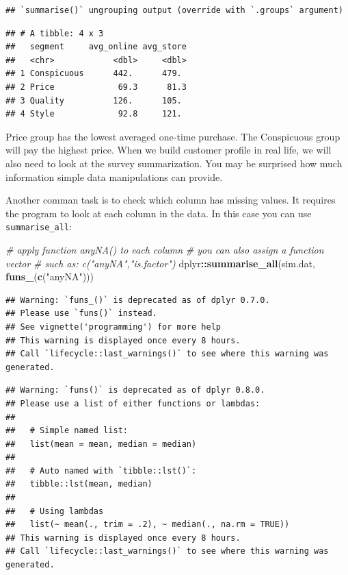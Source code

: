 \documentclass[12pt,]{krantz}
\makeatletter
\newenvironment{Shaded}{\begin{snugshade}}{\end{snugshade}}
\newcommand{\CommentTok}[1]{\textcolor[rgb]{0.37,0.37,0.37}{\textit{#1}}}
\newcommand{\KeywordTok}[1]{\textcolor[rgb]{0.27,0.27,0.27}{\textbf{#1}}}
\newcommand{\NormalTok}[1]{#1}
\newcommand{\OperatorTok}[1]{\textcolor[rgb]{0.43,0.43,0.43}{\textbf{#1}}}
\newcommand{\StringTok}[1]{\textcolor[rgb]{0.5,0.5,0.5}{#1}}
\newenvironment{kframe}{%
\medskip{}
\setlength{\fboxsep}{.8em}
 \def\at@end@of@kframe{}%
 \ifinner\ifhmode%
  \def\at@end@of@kframe{\end{minipage}}%
  \begin{minipage}{\columnwidth}%
 \fi\fi%
 \def\FrameCommand##1{\hskip\@totalleftmargin \hskip-\fboxsep
 \colorbox{shadecolor}{##1}\hskip-\fboxsep
     \hskip-\linewidth \hskip-\@totalleftmargin \hskip\columnwidth}%
 \MakeFramed {\advance\hsize-\width
   \@totalleftmargin\z@ \linewidth\hsize
   \@setminipage}}%
 {\par\unskip\endMakeFramed%
 \at@end@of@kframe}
\renewenvironment{Shaded}{\begin{kframe}}{\end{kframe}}
\makeatother
\begin{document}
\begin{verbatim}
## `summarise()` ungrouping output (override with `.groups` argument)
\end{verbatim}

\begin{verbatim}
## # A tibble: 4 x 3
##   segment     avg_online avg_store
##   <chr>            <dbl>     <dbl>
## 1 Conspicuous      442.      479. 
## 2 Price             69.3      81.3
## 3 Quality          126.      105. 
## 4 Style             92.8     121.
\end{verbatim}

Price group has the lowest averaged one-time purchase. The Conspicuous group will pay the highest price. When we build customer profile in real life, we will also need to look at the survey summarization. You may be surprised how much information simple data manipulations can provide.

Another comman task is to check which column has missing values. It requires the program to look at each column in the data. In this case you can use \texttt{summarise\_all}:

\begin{Shaded}
\begin{Highlighting}[]
\CommentTok{# apply function anyNA() to each column}
\CommentTok{# you can also assign a function vector }
\CommentTok{# such as: c("anyNA","is.factor")}
\NormalTok{dplyr}\OperatorTok{::}\KeywordTok{summarise_all}\NormalTok{(sim.dat, }\KeywordTok{funs_}\NormalTok{(}\KeywordTok{c}\NormalTok{(}\StringTok{"anyNA"}\NormalTok{)))}
\end{Highlighting}
\end{Shaded}

\begin{verbatim}
## Warning: `funs_()` is deprecated as of dplyr 0.7.0.
## Please use `funs()` instead.
## See vignette('programming') for more help
## This warning is displayed once every 8 hours.
## Call `lifecycle::last_warnings()` to see where this warning was generated.
\end{verbatim}

\begin{verbatim}
## Warning: `funs()` is deprecated as of dplyr 0.8.0.
## Please use a list of either functions or lambdas: 
## 
##   # Simple named list: 
##   list(mean = mean, median = median)
## 
##   # Auto named with `tibble::lst()`: 
##   tibble::lst(mean, median)
## 
##   # Using lambdas
##   list(~ mean(., trim = .2), ~ median(., na.rm = TRUE))
## This warning is displayed once every 8 hours.
## Call `lifecycle::last_warnings()` to see where this warning was generated.
\end{verbatim}
\end{document}
